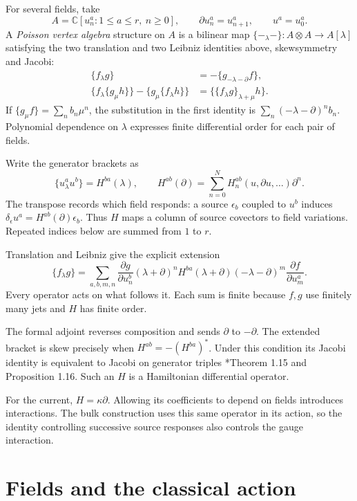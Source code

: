 For\label{pcsm:def:field-jet-algebra} several fields, take
\[
 A=\mathbb C[u^a_n:1\leq a\leq r,\ n\geq0],\qquad
 \partial u^a_n=u^a_{n+1},\qquad u^a=u^a_0.
\]
A \emph{Poisson vertex algebra} structure on \(A\) is a bilinear map
\(\{-_\lambda-\}:A\otimes A\to A[\lambda]\)
satisfying the two translation and two Leibniz identities above,
skewsymmetry and Jacobi:
\begin{align*}
 \{f_\lambda g\}&=-\{g_{-\lambda-\partial}f\},\\
 \{f_\lambda\{g_\mu h\}\}-\{g_\mu\{f_\lambda h\}\}
 &=\{\{f_\lambda g\}_{\lambda+\mu}h\}.
\end{align*}
If \(\{g_\mu f\}=\sum_n b_n\mu^n\), the substitution in the
first identity is \(\sum_n(-\lambda-\partial)^n b_n\).
Polynomial dependence on \(\lambda\) expresses finite differential
order for each pair of fields.

Write\label{pcsm:def:hamiltonian-response} the generator brackets as
\[
 \{u^a_\lambda u^b\}=H^{ba}(\lambda),\qquad
 H^{ab}(\partial)=\sum_{n=0}^N
                 H_n^{ab}(u,\partial u,\ldots)\partial^n.
\]
The transpose records which field responds: a source \(\epsilon_b\)
coupled to \(u^b\) induces
\(\delta_\epsilon u^a=H^{ab}(\partial)\epsilon_b\).
Thus \(H\) maps a column of source covectors to field variations.
Repeated indices below are summed from \(1\) to \(r\).

Translation and Leibniz give the explicit extension
\[
 \{f_\lambda g\}
 =\sum_{a,b,m,n}
 \frac{\partial g}{\partial u^b_n}(\lambda+\partial)^n
 H^{ba}(\lambda+\partial)(-\lambda-\partial)^m
 \frac{\partial f}{\partial u^a_m}.
\]
Every operator acts on what follows it. Each sum is finite because
\(f,g\) use finitely many jets and \(H\) has finite order.

The formal adjoint reverses composition and sends
\(\partial\) to \(-\partial\).
The extended bracket is skew precisely when
\(H^{ab}=-(H^{ba})^*\). Under this condition its Jacobi identity
is equivalent to Jacobi on generator triples
\cite{pcsm:BDK}*{Theorem 1.15 and Proposition 1.16}.
Such an \(H\) is a Hamiltonian differential operator.

For the current, \(H=\kappa\partial\).
Allowing its coefficients to depend on fields introduces interactions.
The bulk construction uses this same operator in its action, so the
identity controlling successive source responses also controls the
gauge interaction.

\section{Fields and the classical action}

